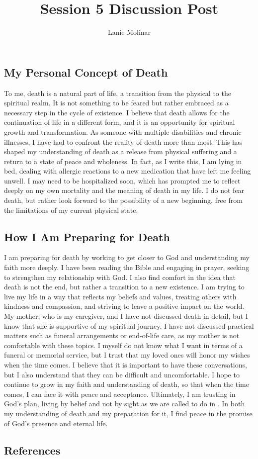\documentclass[stu,12pt,floatsintext]{apa7}
\title{Session 5 Discussion Post}
\author{Lanie Molinar}
\begin{document}
\maketitle
\thispagestyle{plain}
\pagestyle{plain}

\subsection{My Personal Concept of Death}

To me, death is a natural part of life, a transition from the physical to the spiritual realm. It is not something to be feared but rather embraced as a necessary step in the cycle of existence. I believe that death allows for the continuation of life in a different form, and it is an opportunity for spiritual growth and transformation. As someone with multiple disabilities and chronic illnesses, I have had to confront the reality of death more than most. This has shaped my understanding of death as a release from physical suffering and a return to a state of peace and wholeness. In fact, as I write this, I am lying in bed, dealing with allergic reactions to a new medication that have left me feeling unwell. I may need to be hospitalized soon, which has prompted me to reflect deeply on my own mortality and the meaning of death in my life. I do not fear death, but rather look forward to the possibility of a new beginning, free from the limitations of my current physical state.

\subsection{How I Am Preparing for Death}

I am preparing for death by working to get closer to God and understanding my faith more deeply. I have been reading the Bible and engaging in prayer, seeking to strengthen my relationship with God. I also find comfort in the idea that death is not the end, but rather a transition to a new existence. I am trying to live my life in a way that reflects my beliefs and values, treating others with kindness and compassion, and striving to leave a positive impact on the world. My mother, who is my caregiver, and I have not discussed death in detail, but I know that she is supportive of my spiritual journey. I have not discussed practical matters such as funeral arrangements or end-of-life care, as my mother is not comfortable with these topics. I myself do not know what I want in terms of a funeral or memorial service, but I trust that my loved ones will honor my wishes when the time comes. I believe that it is important to have these conversations, but I also understand that they can be difficult and uncomfortable. I hope to continue to grow in my faith and understanding of death, so that when the time comes, I can face it with peace and acceptance. Ultimately, I am trusting in God's plan, living by belief and not by sight as we are called to do in \textcite[2 Corinthians 5:7]{Tyndale1996}. In both my understanding of death and my preparation for it, I find peace in the promise of God’s presence and eternal life.

\subsection{References}

\printbibliography
\end{document}
